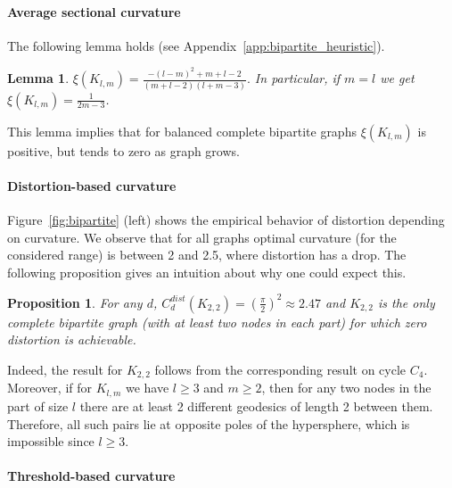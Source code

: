 \documentclass{article} %
\newtheorem{lemma}[theorem]{Lemma}
\newtheorem{proposition}[theorem]{Proposition}
\begin{document}
\paragraph{Average sectional curvature} 
The following lemma holds (see Appendix~\ref{app:bipartite_heuristic}).

\begin{lemma}\label{lem:bipartite_heuristic}
$
\xi({K_{l,m}}) = \frac{-(l - m)^2 + m + l - 2}{(m+l-2)(l+m-3)}.
$
In particular, if $m = l$ we get $\xi({K_{l,m}}) = \frac{1}{2m - 3}$. 
\end{lemma}
This lemma implies that for balanced complete bipartite graphs $\xi({K_{l,m}})$ is positive, but tends to zero as graph grows.



\paragraph{Distortion-based curvature} 

Figure~\ref{fig:bipartite} (left) shows the empirical behavior of distortion depending on curvature. We observe that for all graphs optimal curvature (for the considered range) is between 2 and 2.5, where distortion has a drop. 
The following proposition gives an intuition about why one could expect this. 

\begin{proposition}\label{prop:bipartite_distortion}
For any $d$, $C_d^{dist}(K_{2,2}) = \left(\frac{\pi}{2}\right)^2 \approx 2.47$ and $K_{2,2}$ is the only complete bipartite graph (with at least two nodes in each part) for which zero distortion is achievable.
\end{proposition}

Indeed, the result for $K_{2,2}$ follows from the corresponding result on cycle $C_4$. Moreover, if for $K_{l,m}$ we have $l \ge 3$ and $m \ge 2$, then for any two nodes in the part of size $l$ there are at least 2 different geodesics of length 2 between them. Therefore, all such pairs lie at opposite poles of the hypersphere, which is impossible since $l \ge 3$.


\paragraph{Threshold-based curvature} 
 
\end{document}
